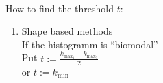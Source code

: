 ~\par

How to find the threshold $t$: 
\begin{enumerate}[1.)]
  \item%
	\begin{minipage}[t]{0.6\linewidth}
	  Shape based methods\\
		If the histogramm is \enquote{biomodal}\\
		Put $ \displaystyle t:= \frac {k_{\max_1} + k_{\max_2}} {2}$\\
		or $\displaystyle t:= k_{\min}$
	\end{minipage} 
\end{enumerate}


